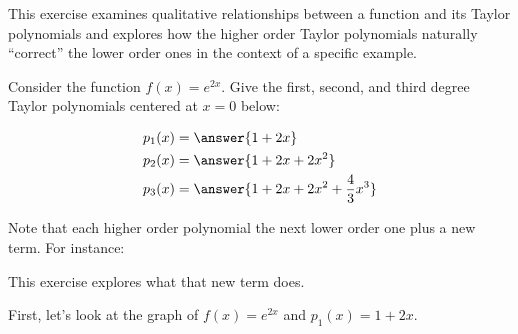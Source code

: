\documentclass{ximera}
\author{Jim Talamo}
\begin{document}
\begin{exercise}
This exercise examines qualitative relationships between a function and its Taylor polynomials and explores how the higher order Taylor polynomials naturally ``correct'' the lower order ones in the context of a specific example.

Consider the function $f(x)=e^{2x}$.  Give the first, second, and third degree Taylor polynomials centered at $x=0$ below:

\begin{align*}
p_1(x) &= \answer{1+2x} \\
p_2(x) &= \answer{1+2x+2x^2} \\
p_3(x) &= \answer{1+2x+2x^2+\frac{4}{3}x^3}
\end{align*}

Note that each higher order polynomial the next lower order one plus a new term.  For instance:

\begin{image}
  \end{image}

This exercise explores what that new term does.

\begin{exercise}
First, let's look at the graph of $f(x)=e^{2x}$ and $p_1(x)=1+2x$.

\begin{image}
\end{image}
\end{exercise}
\end{exercise}
\end{document}
